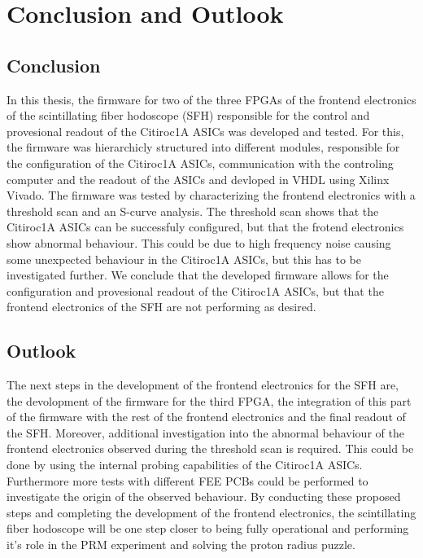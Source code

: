 \chapter{Conclusion and Outlook}
\section{Conclusion}
In this thesis, the firmware for two of the three FPGAs of the frontend electronics of the scintillating fiber hodoscope (SFH) responsible for the control and provesional readout of the Citiroc1A ASICs was developed and tested.
For this, the firmware was hierarchicly structured into different modules, responsible for the configuration of the Citiroc1A ASICs, communication with the controling computer and the readout of the ASICs and devloped in VHDL using Xilinx Vivado.
The firmware was tested by characterizing the frontend electronics with a threshold scan and an S-curve analysis.
The threshold scan shows that the Citiroc1A ASICs can be successfuly configured, but that the frotend electronics show abnormal behaviour.
This could be due to high frequency noise causing some unexpected behaviour in the Citiroc1A ASICs, but this has to be investigated further.
We conclude that the developed firmware allows for the configuration and provesional readout of the Citiroc1A ASICs, 
but that the frontend electronics of the SFH are not performing as desired.

\section{Outlook}
The next steps in the development of the frontend electronics for the SFH are, the devolopment of the firmware for the third FPGA,
the integration of this part of the firmware with the rest of the frontend electronics and the final readout of the SFH.
Moreover, additional investigation into the abnormal behaviour of the frontend electronics observed during the threshold scan is required.
\newline
This could be done by using the internal probing capabilities of the Citiroc1A ASICs.
Furthermore more tests with different FEE PCBs could be performed to investigate the origin of the observed behaviour.
\newline
By conducting these proposed steps and completing the development of the frontend electronics,
the scintillating fiber hodoscope will be one step closer to being fully operational and performing it's role in the PRM experiment and solving the proton radius puzzle.

